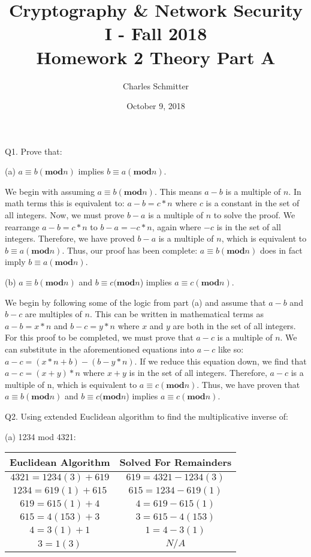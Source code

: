 \documentclass[11pt]{article}
\title{Cryptography \& Network Security I - Fall 2018\\ \large Homework 2 Theory Part A}
\author{Charles Schmitter}
\date{October 9, 2018}
\newcommand{\gap}{\vspace{3mm}}
\newcommand{\bigGap}{\vspace{10mm}}
\begin{document}
\maketitle

Q1. Prove that:

\gap{}

(a) $a\equiv b(\mathbf{mod}n)$ implies $b\equiv a(\mathbf{mod} n)$.

\gap{}

We begin with assuming $a\equiv b(\mathbf{mod}n)$. This means $a-b$ is a multiple of $n$. In math terms this is equivalent to: $a-b=c*n$ where $c$ is a constant in the set of all integers. Now, we must prove $b-a$ is a multiple of $n$ to solve the proof. We rearrange $a-b=c*n$ to $b-a=-c*n$, again where $-c$ is  in the set of all integers. Therefore, we have proved $b-a$ is a multiple of $n$, which is equivalent to $b\equiv a(\mathbf{mod} n)$. Thus, our proof has been complete: $a\equiv b(\mathbf{mod}n)$ does in fact imply $b\equiv a(\mathbf{mod} n)$.

\gap{}

(b) $a\equiv b(\mathbf{mod}n)$ and $b\equiv c(\mathbf{mod}n$) implies $a\equiv c(\mathbf{mod} n)$.

\gap{}

We begin by following some of the logic from part (a) and assume that $a-b$ and $b-c$ are multiples of $n$. This can be written in mathematical terms as $a-b=x*n$ and $b-c=y*n$ where $x$ and $y$ are both in the set of all integers. For this proof to be completed, we must prove that $a-c$ is a multiple of $n$. We can substitute in the aforementioned equations into $a-c$ like so: $a-c=(x*n+b) - (b-y*n)$. If we reduce this equation down, we find that $a-c=(x+y) * n$ where $x+y$ is in the set of all integers. Therefore, $a-c$ is a multiple of n, which is equivalent to $a\equiv c(\mathbf{mod} n)$. Thus, we have proven that $a\equiv b(\mathbf{mod}n)$ and $b\equiv c(\mathbf{mod}n$) implies $a\equiv c(\mathbf{mod} n)$.

\bigGap{}

Q2. Using extended Euclidean algorithm to find the multiplicative inverse of:

\gap{}

(a) 1234 mod 4321:\\

\gap{}

\begin{center}
\begin{tabular}{ |c|c| }
\hline
Euclidean Algorithm & Solved For Remainders\\
\hline
$4321 = 1234(3) + 619$ & $619 = 4321 - 1234(3)$\\
$1234 = 619(1) + 615$ & $615 = 1234 - 619(1)$\\
$619 = 615(1) + 4$ & $4 = 619 - 615(1)$\\
$615 = 4(153) + 3$ & $3 = 615 - 4(153)$\\
$4 = 3(1) + 1$ & $1 = 4 - 3(1)$\\
$3 = 1(3)$ & $N/A$\\
\hline
\end{tabular}
\end{center}
\end{document}
